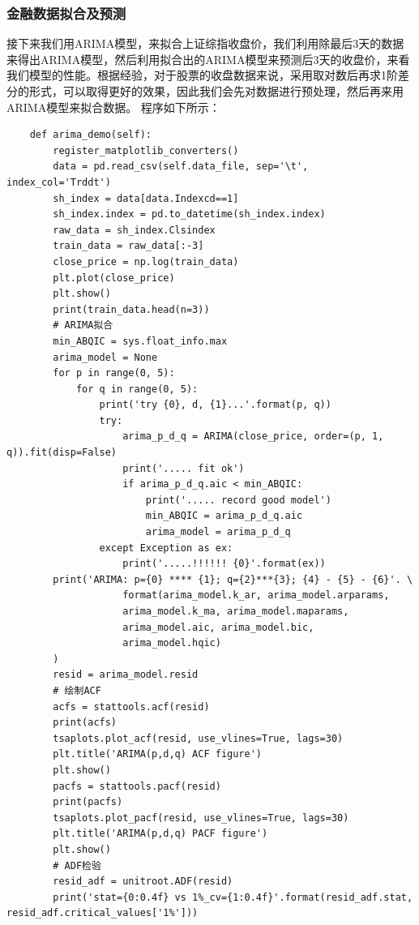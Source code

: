 \documentclass{article}
\begin{document}
\subsubsection{金融数据拟合及预测}
接下来我们用ARIMA模型，来拟合上证综指收盘价，我们利用除最后3天的数据来得出ARIMA模型，然后利用拟合出的ARIMA模型来预测后3天的收盘价，来看我们模型的性能。根据经验，对于股票的收盘数据来说，采用取对数后再求1阶差分的形式，可以取得更好的效果，因此我们会先对数据进行预处理，然后再来用ARIMA模型来拟合数据。\newline
程序如下所示：
\begin{lstlisting}
    def arima_demo(self):
        register_matplotlib_converters()
        data = pd.read_csv(self.data_file, sep='\t', index_col='Trddt')
        sh_index = data[data.Indexcd==1]
        sh_index.index = pd.to_datetime(sh_index.index)
        raw_data = sh_index.Clsindex
        train_data = raw_data[:-3]
        close_price = np.log(train_data)
        plt.plot(close_price)
        plt.show()
        print(train_data.head(n=3))
        # ARIMA拟合
        min_ABQIC = sys.float_info.max
        arima_model = None
        for p in range(0, 5):
            for q in range(0, 5):
                print('try {0}, d, {1}...'.format(p, q))
                try:
                    arima_p_d_q = ARIMA(close_price, order=(p, 1, q)).fit(disp=False)
                    print('..... fit ok')
                    if arima_p_d_q.aic < min_ABQIC:
                        print('..... record good model')
                        min_ABQIC = arima_p_d_q.aic
                        arima_model = arima_p_d_q
                except Exception as ex:
                    print('.....!!!!!! {0}'.format(ex))
        print('ARIMA: p={0} **** {1}; q={2}***{3}; {4} - {5} - {6}'. \
                    format(arima_model.k_ar, arima_model.arparams, 
                    arima_model.k_ma, arima_model.maparams, 
                    arima_model.aic, arima_model.bic, 
                    arima_model.hqic)
        )
        resid = arima_model.resid
        # 绘制ACF
        acfs = stattools.acf(resid)
        print(acfs)
        tsaplots.plot_acf(resid, use_vlines=True, lags=30)
        plt.title('ARIMA(p,d,q) ACF figure')
        plt.show()
        pacfs = stattools.pacf(resid)
        print(pacfs)
        tsaplots.plot_pacf(resid, use_vlines=True, lags=30)
        plt.title('ARIMA(p,d,q) PACF figure')
        plt.show()
        # ADF检验
        resid_adf = unitroot.ADF(resid)
        print('stat={0:0.4f} vs 1%_cv={1:0.4f}'.format(resid_adf.stat, resid_adf.critical_values['1%']))

\end{lstlisting}
\end{document}
